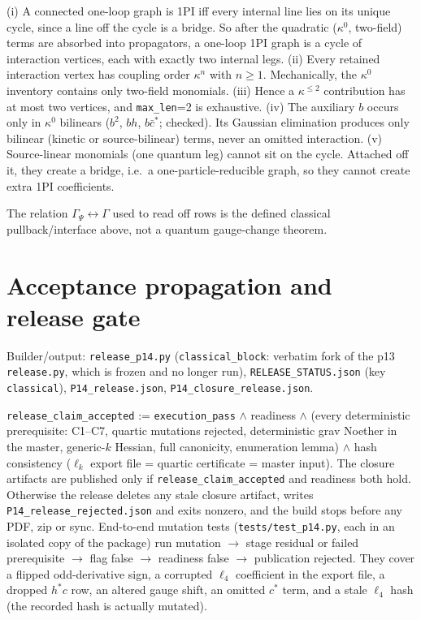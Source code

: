 \begin{lemma}[One-loop enumeration, \texttt{max\_len}=2]
(i) A connected one-loop graph is 1PI iff every internal line lies on its unique cycle, since a line off the cycle is a
bridge. So after the quadratic ($\kappa^0$, two-field) terms are absorbed into propagators, a one-loop 1PI graph is a
cycle of interaction vertices, each with exactly two internal legs.
(ii) Every retained interaction vertex has coupling order $\kappa^n$ with $n\ge1$. Mechanically, the $\kappa^0$
inventory contains only two-field monomials.
(iii) Hence a $\kappa^{\le2}$ contribution has at most two vertices, and \texttt{max\_len}=2 is exhaustive.
(iv) The auxiliary $b$ occurs only in $\kappa^0$ bilinears ($b^2$, $bh$, $b\bar c^*$; checked). Its Gaussian elimination
produces only bilinear (kinetic or source-bilinear) terms, never an omitted interaction.
(v) Source-linear monomials (one quantum leg) cannot sit on the cycle. Attached off it, they create a bridge, i.e.\ a
one-particle-reducible graph, so they cannot create extra 1PI coefficients.
\end{lemma}
\noindent The relation $\Gamma_\Psi\leftrightarrow\Gamma$ used to read off rows is the defined classical
pullback/interface above, not a quantum gauge-change theorem.

\section{Acceptance propagation and release gate}
\noindent Builder/output: \texttt{release\_p14.py} (\texttt{classical\_block}: verbatim fork of the p13
\texttt{release.py}, which is frozen and no longer run), \texttt{RELEASE\_STATUS.json} (key \texttt{classical}),
\texttt{P14\_release.json}, \texttt{P14\_closure\_release.json}.\par\smallskip
\texttt{release\_claim\_accepted} := \texttt{execution\_pass} $\wedge$ readiness $\wedge$ (every deterministic
prerequisite: C1--C7, quartic mutations rejected, deterministic grav Noether in the master, generic-$k$ Hessian, full
canonicity, enumeration lemma) $\wedge$ hash consistency ($\ell_k$ export file = quartic certificate = master input).
The closure artifacts are published only if \texttt{release\_claim\_accepted} and readiness both hold. Otherwise the
release deletes any stale closure artifact, writes \texttt{P14\_release\_rejected.json} and exits nonzero, and the
build stops before any PDF, zip or sync. End-to-end mutation tests (\texttt{tests/test\_p14.py}, each in an isolated
copy of the package) run mutation $\to$ stage residual or failed prerequisite $\to$ flag false $\to$ readiness false
$\to$ publication rejected. They cover a flipped odd-derivative sign, a corrupted $\ell_4$ coefficient in the export file,
a dropped $h^*c$ row, an altered gauge shift, an omitted $c^*$ term, and a stale $\ell_4$ hash (the recorded hash is
actually mutated).

